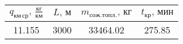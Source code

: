 \begin{tabular}{|c|c|c|c|}
\hline
$q_{км\, ср},\, \frac{кг}{км}$ & $L,\, м$ & $m_{сож. топл.},\, кг$ & $t_{кр},\, мин$ \\ 
\hline
11.155 & 3000 & 33464.02 & 275.85 \\ 
\hline
\end{tabular}
